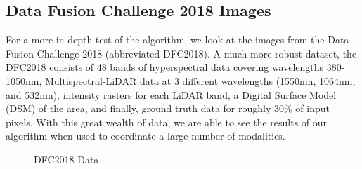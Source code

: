 \documentclass[journal]{IEEEtran}
\begin{document}
\subsection{Data Fusion Challenge 2018 Images}
For a more in-depth test of the algorithm, we look at the images from the Data Fusion Challenge 2018 (abbreviated DFC2018). A much more robust dataset, the DFC2018 consists of 48 bands of hyperspectral data covering wavelengths 380-1050nm, Multispectral-LiDAR data at 3 different wavelengths (1550nm, 1064nm, and 532nm), intensity rasters for each LiDAR band, a Digital Surface Model (DSM) of the area, and finally, ground truth data for roughly 30\% of input pixels. With this great wealth of data, we are able to see the results of our algorithm when used to coordinate a large number of modalities.

\begin{figure}[!t]
  \centering {} %
  \hfil%
  \hfil%
  \hfil%
  \hfil%
  \hfil%
  \caption{DFC2018 Data}
  \label{fig:DFC2018}
\end{figure}
\end{document}
